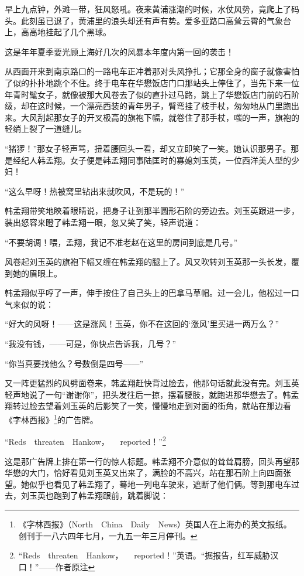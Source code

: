 \par 早上九点钟，外滩一带，狂风怒吼。夜来黄浦涨潮的时候，水仗风势，竟爬上了码头。此刻虽已退了，黄浦里的浪头却还有声有势。爱多亚路口高耸云霄的气象台上，高高地挂起了几个黑球。
\par 这是年年夏季要光顾上海好几次的风暴本年度内第一回的袭击！
\par 从西面开来到南京路口的一路电车正冲着那对头风挣扎；它那全身的窗子就像害怕了似的扑扑地跳个不住。终于电车在华懋饭店门口那站头上停住了，当先下来一位年青时髦女子，就像被那大风卷去了似的直扑过马路，跳上了华懋饭店门前的石阶级，却在这时候，一个漂亮西装的青年男子，臂弯挂了枝手杖，匆匆地从门里跑出来。大风刮起那女子的开叉极高的旗袍下幅，就卷住了那手杖，嗤的一声，旗袍的轻绡上裂了一道缝儿。
\par “猪猡！”那女子轻声骂，扭着腰回头一看，却又立即笑了一笑。她认识那男子。那是经纪人韩孟翔。女子便是韩孟翔同事陆匡时的寡媳刘玉英，一位西洋美人型的少妇！
\par “这么早呀！热被窝里钻出来就吹风，不是玩的！”
\par 韩孟翔带笑地鿃着眼睛说，把身子让到那半圆形石阶的旁边去。刘玉英跟进一步，装出怒容来瞪了韩孟翔一眼，忽又笑了笑，轻声说道：
\par “不要胡调！喂，孟翔，我记不准老赵在这里的房间到底是几号。”
\par 风卷起刘玉英的旗袍下幅又缠在韩孟翔的腿上了。风又吹转刘玉英那一头长发，覆到她的眉眼上。
\par 韩孟翔似乎哼了一声，伸手按住了自己头上的巴拿马草帽。过一会儿，他松过一口气来似的说：
\par “好大的风呀！——这是涨风！玉英，你不在这回的‘涨风’里买进一两万么？”
\par “我没有钱，——可是，你快点告诉我，几号？”
\par “你当真要找他么？号数倒是四号——”
\par 又一阵更猛烈的风劈面卷来，韩孟翔赶快背过脸去，他那句话就此没有完。刘玉英轻声地说了一句“谢谢你”，把头发往后一掠，摆着腰肢，就跑进那华懋去了。韩孟翔转过脸去望着刘玉英的后影笑了一笑，慢慢地走到对面的街角，就站在那边看《字林西报》\footnote{《字林西报》（North　China　Daily　News）英国人在上海办的英文报纸。创刊于一八六四年七月，一九五一年三月停刊。}的广告牌。
\par “Reds　threaten　Hankow， 　reported！”\footnote{“Reds　threaten　Hankow， 　reported！”英语。“据报告，红军威胁汉口！”——作者原注}
\par 这是那广告牌上排在第一行的惊人标题。韩孟翔不介意似的耸耸肩膀，回头再望那华懋的大门，恰好看见刘玉英又出来了，满脸的不高兴，站在那石阶上向四面张望。她似乎也看见了韩孟翔了，蓦地一列电车驶来，遮断了他们俩。等到那电车过去，刘玉英也跑到了韩孟翔跟前，跳着脚说：
